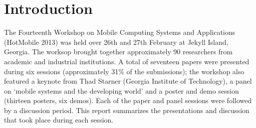 \section{Introduction}
\label{sec:introduction}

The Fourteenth Workshop on Mobile Computing Systems and Applications (HotMobile 
2013) was held over 26th and 27th February at Jekyll Island, Georgia. The worksop 
brought together approximately 90 researchers from academic and industrial 
institutions. A total of seventeen papers were presented during six
sessions (approximately 31\% of the submissions); the workshop
also featured a keynote from  Thad Starner (Georgia Institute of
Technology), a panel on `mobile systems and the developing world' and a
poster and demo session (thirteen posters, six demos). Each of the paper and
panel sessions were followed by a discussion period. This report summarizes the
presentations and discussion that took place during each session.